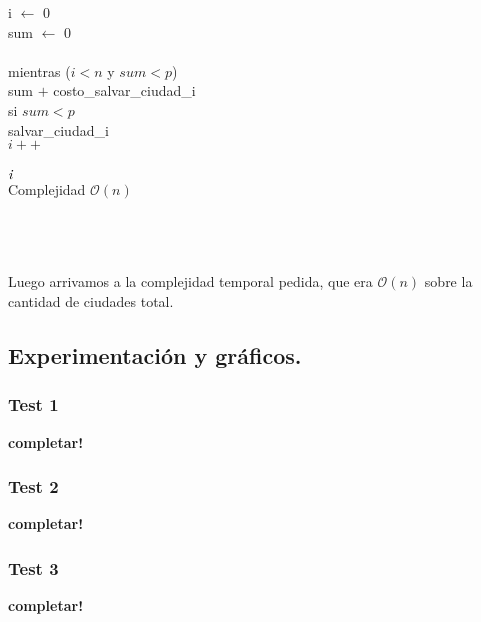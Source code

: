 \\
\\
\\
\\
\begin{codebox}
\\
i $\longleftarrow$ 0\\
sum $\longleftarrow$ 0\\
\\
mientras ($i<n$ y $sum<p$) \\
   
   \quad sum $+$ costo_salvar_ciudad_i\\
   
   \quad si $sum<p$\\
      \quad  \qquad salvar_ciudad_i\\
  \quad $i++$\\
   \\
\Return $\id{i}$       
 \\
 Complejidad $\mathcal{O}(n)$
\end{codebox} 
\\
\\
\\
Luego arrivamos a la complejidad temporal pedida, que era $\mathcal{O}(n)$ sobre la cantidad de ciudades total.


\newpage
\subsection{Experimentación y gráficos.}

\vspace*{0.3cm}

\subsubsection{Test 1}

\vspace*{0.3cm}

\textbf{completar!}


\newpage
\subsubsection{Test 2}

\vspace*{0.3cm}

\textbf{completar!}


\newpage
\subsubsection{Test 3}

\vspace*{0.3cm}

\textbf{completar!}
